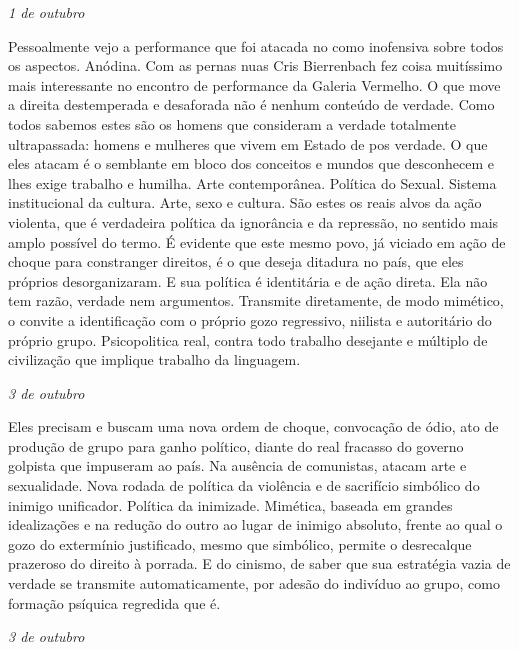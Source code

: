 \begin{flushright}
\emph{1 de outubro}
\end{flushright}

Pessoalmente vejo a performance que foi atacada no  como inofensiva
sobre todos os aspectos. Anódina. Com as pernas nuas Cris Bierrenbach
fez coisa muitíssimo mais interessante no encontro de performance da
Galeria Vermelho. O que move a direita destemperada e desaforada não é
nenhum conteúdo de verdade. Como todos sabemos estes são os homens que
consideram a verdade totalmente ultrapassada: homens e mulheres que
vivem em Estado de pos verdade. O que eles atacam é o semblante em bloco
dos conceitos e mundos que desconhecem e lhes exige trabalho e humilha.
Arte contemporânea. Política do Sexual. Sistema institucional da
cultura. Arte, sexo e cultura. São estes os reais alvos da ação
violenta, que é verdadeira política da ignorância e da repressão, no
sentido mais amplo possível do termo. É evidente que este mesmo povo, já
viciado em ação de choque para constranger direitos, é o que deseja
ditadura no país, que eles próprios desorganizaram. E sua política é
identitária e de ação direta. Ela não tem razão, verdade nem argumentos.
Transmite diretamente, de modo mimético, o convite a identificação com o
próprio gozo regressivo, niilista e autoritário do próprio grupo.
Psicopolitica real, contra todo trabalho desejante e múltiplo de
civilização que implique trabalho da linguagem.

\pagebreak

\begin{flushright}
\emph{3 de outubro}
\end{flushright}

Eles precisam e buscam uma nova ordem de choque, convocação de ódio, ato
de produção de grupo para ganho político, diante do real fracasso do
governo golpista que impuseram ao país. Na ausência de comunistas,
atacam arte e sexualidade. Nova rodada de política da violência e de
sacrifício simbólico do inimigo unificador. Política da inimizade.
Mimética, baseada em grandes idealizações e na redução do outro ao lugar
de inimigo absoluto, frente ao qual o gozo do extermínio justificado,
mesmo que simbólico, permite o desrecalque prazeroso do direito à
porrada. E do cinismo, de saber que sua estratégia vazia de verdade se
transmite automaticamente, por adesão do indivíduo ao grupo, como
formação psíquica regredida que é.

\begin{flushright}
\emph{3 de outubro}
\end{flushright}

